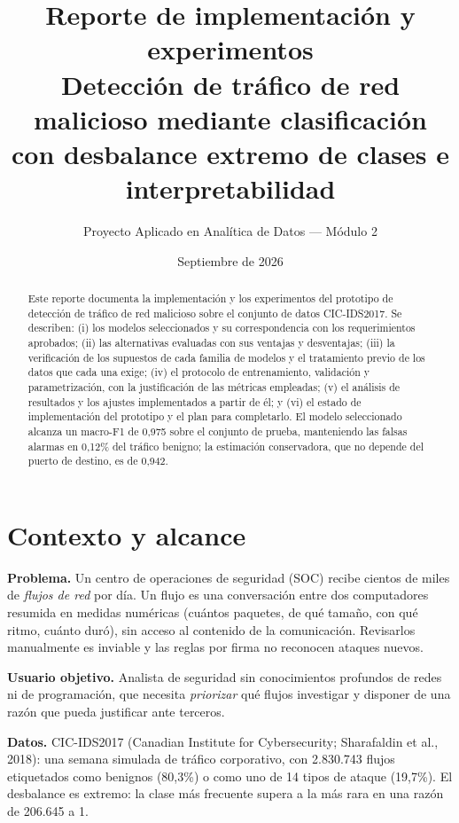 \documentclass[11pt,a4paper]{article}
\title{\vspace{-1.2cm}\textbf{Reporte de implementación y experimentos}\\[0.25cm]
\large Detección de tráfico de red malicioso mediante clasificación\\
\large con desbalance extremo de clases e interpretabilidad}
\author{Proyecto Aplicado en Analítica de Datos --- Módulo 2}
\date{Septiembre de 2026}
\begin{document}
\maketitle
\thispagestyle{empty}

\begin{abstract}
\noindent
Este reporte documenta la implementación y los experimentos del prototipo de
detección de tráfico de red malicioso sobre el conjunto de datos CIC-IDS2017.
Se describen: (i) los modelos seleccionados y su correspondencia con los
requerimientos aprobados; (ii) las alternativas evaluadas con sus ventajas y
desventajas; (iii) la verificación de los supuestos de cada familia de
modelos y el tratamiento previo de los datos que cada una exige; (iv) el
protocolo de entrenamiento, validación y parametrización, con la
justificación de las métricas empleadas; (v) el análisis de resultados y los
ajustes implementados a partir de él; y (vi) el estado de implementación del
prototipo y el plan para completarlo. El modelo seleccionado alcanza un
macro-F1 de 0,975 sobre el conjunto de prueba, manteniendo las falsas alarmas
en 0,12\% del tráfico benigno; la estimación conservadora, que no depende del
puerto de destino, es de 0,942.
\end{abstract}

\vspace{0.3cm}

\section{Contexto y alcance}

\textbf{Problema.} Un centro de operaciones de seguridad (SOC) recibe cientos
de miles de \emph{flujos de red} por día. Un flujo es una conversación entre
dos computadores resumida en medidas numéricas (cuántos paquetes, de qué
tamaño, con qué ritmo, cuánto duró), sin acceso al contenido de la
comunicación. Revisarlos manualmente es inviable y las reglas por firma no
reconocen ataques nuevos.

\textbf{Usuario objetivo.} Analista de seguridad sin conocimientos profundos
de redes ni de programación, que necesita \emph{priorizar} qué flujos
investigar y disponer de una razón que pueda justificar ante terceros.

\textbf{Datos.} CIC-IDS2017 (Canadian Institute for Cybersecurity;
Sharafaldin et al., 2018): una semana
simulada de tráfico corporativo, con 2.830.743 flujos etiquetados como
benignos (80,3\%) o como uno de 14 tipos de ataque (19,7\%). El desbalance es
extremo: la clase más frecuente supera a la más rara en una razón de
206.645 a 1.
\end{document}
